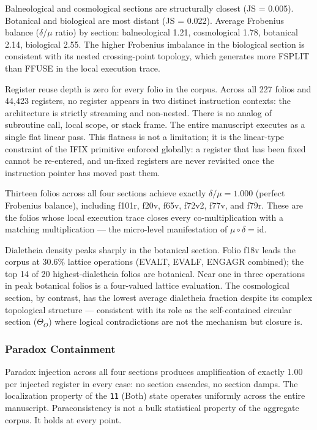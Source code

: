 \documentclass[12pt,a4paper]{article}
\begin{document}
Balneological and cosmological sections are structurally closest (JS = 0.005). Botanical and biological are most distant (JS = 0.022). Average Frobenius balance ($\delta$/$\mu$ ratio) by section: balneological 1.21, cosmological 1.78, botanical 2.14, biological 2.55. The higher Frobenius imbalance in the biological section is consistent with its nested crossing-point topology, which generates more FSPLIT than FFUSE in the local execution trace.

Register reuse depth is zero for every folio in the corpus. Across all 227 folios and 44,423 registers, no register appears in two distinct instruction contexts: the architecture is strictly streaming and non-nested. There is no analog of subroutine call, local scope, or stack frame. The entire manuscript executes as a single flat linear pass. This flatness is not a limitation; it is the linear-type constraint of the IFIX primitive enforced globally: a register that has been fixed cannot be re-entered, and un-fixed registers are never revisited once the instruction pointer has moved past them.

Thirteen folios across all four sections achieve exactly $\delta/\mu = 1.000$ (perfect Frobenius balance), including f101r, f20v, f65v, f72v2, f77v, and f79r. These are the folios whose local execution trace closes every co-multiplication with a matching multiplication --- the micro-level manifestation of $\mu \circ \delta = \mathrm{id}$.

Dialetheia density peaks sharply in the botanical section. Folio f18v leads the corpus at 30.6\% lattice operations (EVALT, EVALF, ENGAGR combined); the top 14 of 20 highest-dialetheia folios are botanical. Near one in three operations in peak botanical folios is a four-valued lattice evaluation. The cosmological section, by contrast, has the lowest average dialetheia fraction despite its complex topological structure --- consistent with its role as the self-contained circular section ($\Theta_O$) where logical contradictions are not the mechanism but closure is.

\subsubsection{Paradox Containment}

Paradox injection across all four sections produces amplification of exactly 1.00 per injected register in every case: no section cascades, no section damps. The localization property of the \texttt{11} (Both) state operates uniformly across the entire manuscript. Paraconsistency is not a bulk statistical property of the aggregate corpus. It holds at every point.
\end{document}
